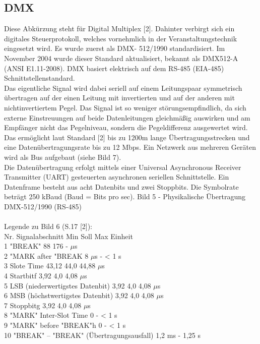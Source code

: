 \documentclass{scrartcl}
\begin{document}
\subsection{DMX}
Diese Abkürzung steht für Digital Multiplex [2]. Dahinter verbirgt sich ein digitales Steuerprotokoll,
welches vornehmlich in der Veranstaltungstechnik eingesetzt wird. Es wurde zuerst als DMX-
512/1990 standardisiert. Im November 2004 wurde dieser Standard aktualisiert, bekannt als
DMX512-A (ANSI E1.11-2008). DMX basiert elektrisch auf dem RS-485 (EIA-485)
Schnittstellenstandard.\\
Das eigentliche Signal wird dabei seriell auf einem Leitungspaar symmetrisch übertragen auf der
einen Leitung mit invertierten und auf der anderen mit nichtinvertiertem Pegel. Das Signal ist so
weniger störungsempfindlich, da sich externe Einstreuungen auf beide Datenleitungen gleichmäßig
auswirken und am Empfänger nicht das Pegelniveau, sondern die Pegeldifferenz ausgewertet wird.
Das ermöglicht laut Standard [2] bis zu 1200m lange Übertragungsstrecken und eine
Datenübertragungsrate bis zu 12 Mbps. Ein Netzwerk aus mehreren Geräten wird als Bus aufgebaut
(siehe Bild 7).\\
Die Datenübertragung erfolgt mittels einer Universal Asynchronous Receiver Transmitter (UART)
gesteuerten asynchronen seriellen Schnittstelle. Ein Datenframe besteht aus acht Datenbits und zwei
Stoppbits. Die Symbolrate beträgt 250 kBaud (Baud = Bits pro sec).
Bild 5 - Physikalische Übertragung DMX-512/1990 (RS-485)\\
\\
Legende zu Bild 6 (S.17 [2]):\\
Nr. Signalabschnitt Min Soll Max Einheit\\
1 "BREAK" 88 176 - $\mu$s\\
2 "MARK after "BREAK 8 $\mu$s - < 1 s\\
3 Slote Time 43,12 44,0 44,88 $\mu$s\\
4 Startbitf 3,92 4,0 4,08 $\mu$s\\
5 LSB (niederwertigstes Datenbit) 3,92 4,0 4,08 $\mu$s\\
6 MSB (höchstwertigstes Datenbit) 3,92 4,0 4,08 $\mu$s\\
7 Stoppbitg 3,92 4,0 4,08 $\mu$s\\
8 "MARK" Inter-Slot Time 0 - < 1 s\\
9 "MARK" before "BREAK"h 0 - < 1 s\\
10 "BREAK" – "BREAK" (Übertragungsausfall) 1,2 ms - 1,25 s\\
\end{document}
